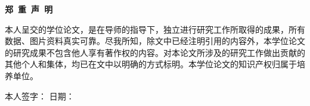 \vbox{}
\vskip 1cm
\centerline{\songti{}\textbf{郑\ 重\ 声\ 明}}
\vskip 2cm

\songti{}
本人呈交的学位论文，是在导师的指导下，独立进行研究工作所取得的成果，所有数据、图片资料真实可靠。尽我所知，除文中已经注明引用的内容外，本学位论文的研究成果不包含他人享有著作权的内容。对本论文所涉及的研究工作做出贡献的其他个人和集体，均已在文中以明确的方式标明。本学位论文的知识产权归属于培养单位。

\vskip 3cm

本人签字： \qquad \quad 日期：



